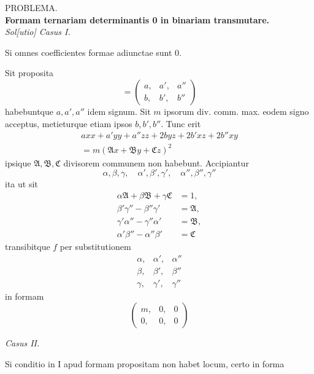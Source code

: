 \begin{center}PROBLEMA.\\[6pt]
\textbf{Formam ternariam determinantis 0 in binariam transmutare.}\\[6pt]
\textit{Sol[utio] Casus I.}\end{center}
\noindent\hspace*{\parindent}Si omnes coefficientes formae adiunctae sunt 0.\par
\noindent\hspace*{\parindent}Sit proposita
\[
=\left(\begin{array}{ccc}a,&a',&a''\\b,&b',&b''\end{array}\right)
\]
\noindent habebuntque $a,a',a''$ idem signum. Sit $m$ ipsorum div. comm. max. eodem
signo acceptus, metieturque etiam ipsos $b,b',b''$. Tunc erit
\[
\begin{gathered}
axx+a'yy+a''zz+2byz+2b'xz+2b''xy\\
=m(\mathfrak{A}x+\mathfrak{B}y+\mathfrak{C}z)^2
\end{gathered}
\]
\noindent ipsique $\mathfrak{A},\mathfrak{B},\mathfrak{C}$ divisorem communem non habebunt.
Accipiantur
\[
\alpha,\beta,\gamma,\quad\alpha',\beta',\gamma',\quad\alpha'',\beta'',\gamma''
\]
\noindent ita ut sit
\[
\begin{aligned}
\alpha\mathfrak{A}+\beta\mathfrak{B}+\gamma\mathfrak{C}&=1,\\
\beta'\gamma''-\beta''\gamma'&=\mathfrak{A},\\
\gamma'\alpha''-\gamma''\alpha'&=\mathfrak{B},\\
\alpha'\beta''-\alpha''\beta'&=\mathfrak{C}
\end{aligned}
\]
\clearpage
{}
\noindent transibitque $f$ per substitutionem
\[
\begin{array}{ccc}\alpha,&\alpha',&\alpha''\\\beta,&\beta',&\beta''\\\gamma,&\gamma',&\gamma''\end{array}
\]
\noindent in formam
\[
\left(\begin{array}{ccc}m,&0,&0\\0,&0,&0\end{array}\right)
\]
\begin{center}\textit{Casus II.}\end{center}
\noindent\hspace*{\parindent}Si conditio in I apud formam propositam non habet locum, certo in forma
